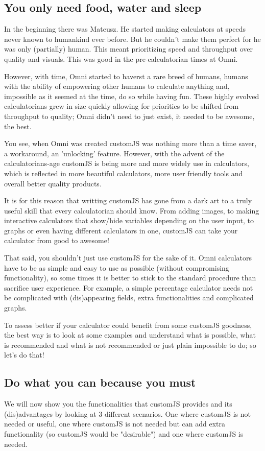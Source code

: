 \subsection{You only need food, water and sleep}
\label{sub:need}
In the beginning there was Mateusz. He started making calculators at speeds never known to humankind ever before. But he couldn't make them perfect for he was only (partially) human. This meant prioritizing speed and throughput over quality and visuals. This was good in the pre-calculatorian times at Omni.

However, with time, Omni started to haverst a rare breed of humans, humans with the ability of empowering other humans to calculate anything and, impossible as it seemed at the time, do so while having fun. These highly evolved calculatorians grew in size quickly allowing for priorities to be shifted from throughput to quality; Omni didn't need to just exist, it needed to be awesome, the best.

You see, when Omni was created customJS was nothing more than a time saver, a workaround, an 'unlocking' feature. However, with the advent of the calculatorians-age customJS is being more and more widely use in calculators, which is reflected in more beautiful calculators, more user friendly tools and overall better quality products. 

It is for this reason that writting customJS has gone from a dark art to a truly useful skill that every calculatorian should know. From adding images, to making interactive calculators that show/hide variables depending on the user input, to graphs or even having different calculators in one, customJS can take your calculator from good to awesome!

That said, you shouldn't just use customJS for the sake of it. Omni calculators have to be as simple and easy to use as possible (without compromising functionality), so some times it is better to stick to the standard procedure than sacrifice user experience. For example, a simple percentage calculator needs not be complicated with (dis)appearing fields, extra functionalities and complicated graphs.

To assess better if your calculator could benefit from some customJS goodness, the best way is to look at some examples and understand what is possible, what is recommended and what is not recommended or just plain impossible to do; so let's do that!

\subsection{Do what you can because you must}
\label{sub:whenToCJS}
We will now show you the functionalities that customJS provides and its (dis)advantages by looking at 3 different scenarios. One where customJS is not needed or useful, one where customJS is not needed but can add extra functionality (so customJS would be "desirable") and one where customJS is needed.

